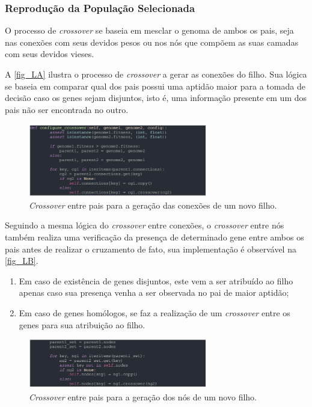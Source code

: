 \subsubsection{Reprodução da População Selecionada}

O processo de \textit{crossover} se baseia em mesclar o genoma de ambos os pais,
seja nas conexões com seus devidos pesos ou nos nós que compõem as suas camadas com seus devidos vieses.

A \autoref{fig_LA} ilustra o processo de \textit{crossover} a gerar as conexões do filho.
Sua lógica se baseia em comparar qual dos pais possui uma aptidão maior para a tomada de
decisão caso os genes sejam disjuntos, isto é, uma informação presente em um dos pais não ser encontrada no outro.

\begin{figure}[htb]
        \centering
        \caption{\label{fig_LA}\textit{Crossover} entre pais para a geração das conexões de um novo filho.}
        \includegraphics[width=0.7\textwidth]{images/LA.png}
\end{figure}

Seguindo a mesma lógica do \textit{crossover} entre conexões, o \textit{crossover} entre
nós também realiza uma verificação da presença de determinado gene entre ambos os pais antes
de realizar o cruzamento de fato, sua implementação é observável na \autoref{fig_LB}.

\begin{enumerate}
	\item Em caso de existência de genes disjuntos, este vem a ser atribuído ao filho apenas caso sua presença venha a  ser observada no pai de maior aptidão;
	\item Em caso de genes homólogos, se faz a realização de um \textit{crossover} entre os genes para sua atribuição ao filho.
\end{enumerate}

\begin{figure}[htb]
        \centering
        \caption{\label{fig_LB}\textit{Crossover} entre pais para a geração dos nós de um novo filho.}
        \includegraphics[width=0.7\textwidth]{images/LB.png}
\end{figure}

